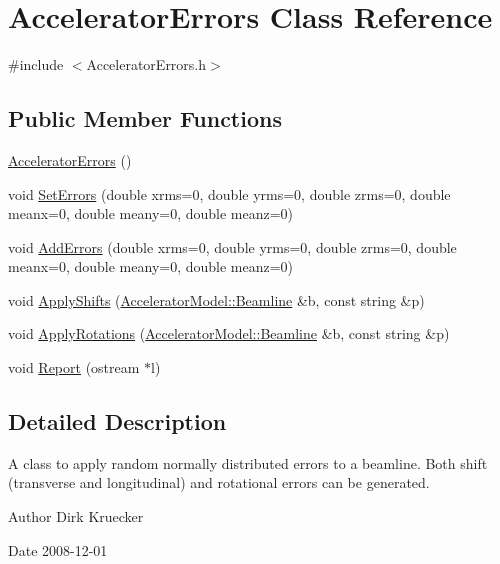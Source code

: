\hypertarget{classAcceleratorErrors}{}\section{Accelerator\+Errors Class Reference}
\label{classAcceleratorErrors}


{\ttfamily \#include $<$Accelerator\+Errors.\+h$>$}

\subsection*{Public Member Functions}
\begin{DoxyCompactItemize}
\item 
\hyperlink{classAcceleratorErrors_a7abb6cc331fd2e15b613c494278fc3a7}{Accelerator\+Errors} ()
\item 
void \hyperlink{classAcceleratorErrors_a311e816f0302392322af08a8399cc117}{Set\+Errors} (double xrms=0, double yrms=0, double zrms=0, double meanx=0, double meany=0, double meanz=0)
\item 
void \hyperlink{classAcceleratorErrors_a1f8965c77693446153115e78259c8f31}{Add\+Errors} (double xrms=0, double yrms=0, double zrms=0, double meanx=0, double meany=0, double meanz=0)
\item 
void \hyperlink{classAcceleratorErrors_a75f6bf4af0e2a4a562c246a1a4307315}{Apply\+Shifts} (\hyperlink{classAcceleratorModel_1_1Beamline}{Accelerator\+Model\+::\+Beamline} \&b, const string \&p)
\item 
void \hyperlink{classAcceleratorErrors_af8b9a5703660bc525e53697d50e97fe2}{Apply\+Rotations} (\hyperlink{classAcceleratorModel_1_1Beamline}{Accelerator\+Model\+::\+Beamline} \&b, const string \&p)
\item 
void \hyperlink{classAcceleratorErrors_a39081834644d4132b258749094febd7a}{Report} (ostream $\ast$l)
\end{DoxyCompactItemize}


\subsection{Detailed Description}
A class to apply random normally distributed errors to a beamline. Both shift (transverse and longitudinal) and rotational errors can be generated. \begin{DoxyAuthor}{Author}
Dirk Kruecker 
\end{DoxyAuthor}
\begin{DoxyDate}{Date}
2008-\/12-\/01 
\end{DoxyDate}


